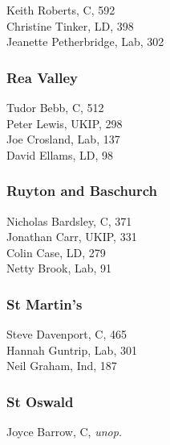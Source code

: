 \documentclass[a4paper,openany,10pt]{book}
\begin{document}


Keith Roberts, C, 592\\
Christine Tinker, LD, 398\\
Jeanette Petherbridge, Lab, 302\\


\subsubsection*{Rea Valley}



Tudor Bebb, C, 512\\
Peter Lewis, UKIP, 298\\
Joe Crosland, Lab, 137\\
David Ellams, LD, 98\\


\subsubsection*{Ruyton and Baschurch}



Nicholas Bardsley, C, 371\\
Jonathan Carr, UKIP, 331\\
Colin Case, LD, 279\\
Netty Brook, Lab, 91\\


\subsubsection*{St Martin's}



Steve Davenport, C, 465\\
Hannah Guntrip, Lab, 301\\
Neil Graham, Ind, 187\\


\subsubsection*{St Oswald}



Joyce Barrow, C, \emph{unop.}\\
\end{document}
